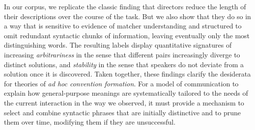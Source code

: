 \documentclass[alpha-refs]{wiley-article}
\begin{document}

In our corpus, we replicate the classic finding that directors reduce the length of their descriptions over the course of the task. But we also show that they do so in a way that is sensitive to evidence of matcher understanding and structured to omit redundant syntactic chunks of information, leaving eventually only the most distinguishing words.
The resulting labels display quantitative signatures of increasing \emph{arbitrariness} in the sense that different pairs increasingly diverge to distinct solutions, and \emph{stability} in the sense that speakers do not deviate from a solution once it is discovered.
Taken together, these findings clarify the desiderata for theories of \emph{ad hoc convention formation}.
For a model of communication to explain how general-purpose meanings are systematically tailored to the needs of the current interaction in the way we observed, it must provide a mechanism to select and combine syntactic phrases that are initially distinctive and to prune them over time, modifying them if they are unsuccessful.
\end{document}

